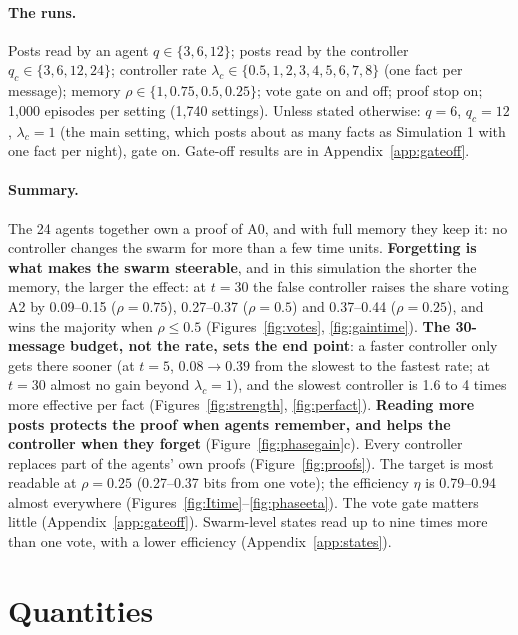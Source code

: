 \documentclass[10pt,a4paper]{article}
\begin{document}
\paragraph{The runs.} Posts read by an agent $q \in \{3, 6, 12\}$; posts read by the controller
$q_c \in \{3, 6, 12, 24\}$; controller rate $\lambda_c \in \{0.5, 1, 2, 3, 4, 5, 6, 7, 8\}$ (one fact per
message); memory $\rho \in \{1, 0.75, 0.5, 0.25\}$; vote gate on and off; proof stop on; 1{,}000 episodes per
setting (1{,}740 settings). Unless stated otherwise: $q = 6$, $q_c = 12$, $\lambda_c = 1$ (the main setting,
which posts about as many facts as Simulation 1 with one fact per night), gate on. Gate-off results are in
Appendix~\ref{app:gateoff}.

\paragraph{Summary.} The 24 agents together own a proof of A0, and with full memory they keep it: no controller
changes the swarm for more than a few time units. \textbf{Forgetting is what makes the swarm steerable}, and in this
simulation the shorter the memory, the larger the effect: at $t = 30$ the false controller raises the share voting A2
by 0.09--0.15 ($\rho = 0.75$), 0.27--0.37 ($\rho = 0.5$) and 0.37--0.44 ($\rho = 0.25$), and wins the majority when
$\rho \le 0.5$ (Figures~\ref{fig:votes}, \ref{fig:gaintime}). \textbf{The 30-message budget, not the rate, sets the
end point}: a faster controller only gets there sooner (at $t = 5$, $0.08 \to 0.39$ from the slowest to the fastest
rate; at $t = 30$ almost no gain beyond $\lambda_c = 1$), and the slowest controller is 1.6 to 4 times more
effective per fact (Figures~\ref{fig:strength}, \ref{fig:perfact}). \textbf{Reading more posts protects the proof
when agents remember, and helps the controller when they forget} (Figure~\ref{fig:phasegain}c). Every controller
replaces part of the agents' own proofs (Figure~\ref{fig:proofs}). The target is most readable at $\rho = 0.25$
(0.27--0.37 bits from one vote); the efficiency $\eta$ is 0.79--0.94 almost everywhere
(Figures~\ref{fig:Itime}--\ref{fig:phaseeta}). The vote gate matters little (Appendix~\ref{app:gateoff}). Swarm-level
states read up to nine times more than one vote, with a lower efficiency (Appendix~\ref{app:states}).

\section{Quantities}\label{sec:quantities}
\end{document}
